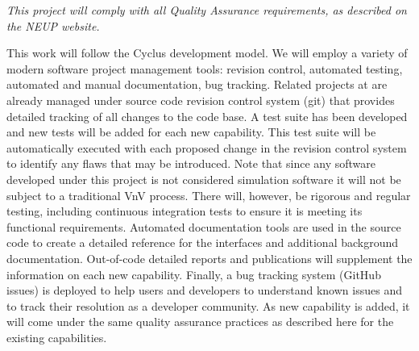 \textit{This project will comply with all Quality Assurance requirements, as
described on the NEUP website.}

This work will follow the Cyclus development model.  We will employ a variety
of modern software project management tools: revision control, automated
testing, automated and manual documentation, bug tracking. Related projects at
are already managed under source code revision control system (git) that
provides detailed tracking of all changes to the code base. A test suite has
been developed and new tests will be added for each new capability. This test
suite will be automatically executed with each proposed change in the revision
control system to identify any flaws that may be introduced. Note that since
any software developed under this project is not considered simulation software
it will not be subject to a traditional \gls{VnV} process.  There will,
however, be rigorous and regular testing, including continuous integration
tests to ensure it is meeting its functional requirements. Automated
documentation tools are used in the source code to create a detailed reference
for the interfaces and additional background documentation. Out-of-code
detailed reports and publications will supplement the information on each new
capability.  Finally, a bug tracking system (GitHub issues) is deployed to
help users and developers to understand known issues and to track their
resolution as a developer community. As new capability is added, it will come
under the same quality assurance practices as described here for the existing
capabilities.
